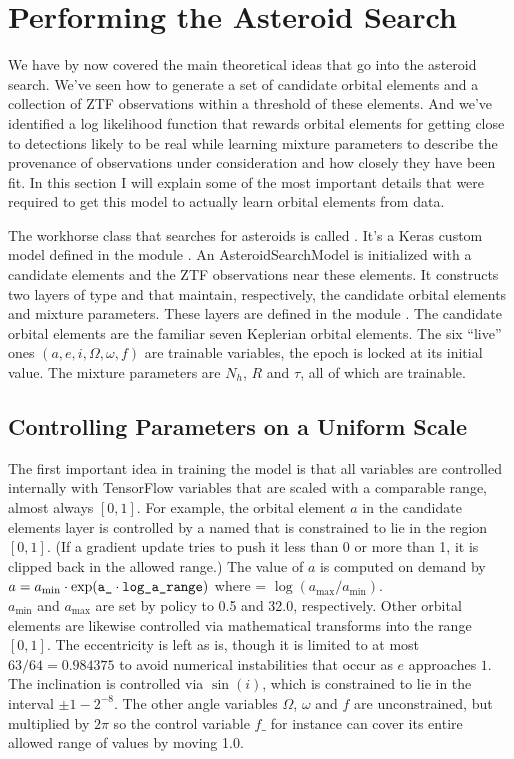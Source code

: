 \section{Performing the Asteroid Search}
\label{section_asteroid_search}
We have by now covered the main theoretical ideas that go into the asteroid search.
We've seen how to generate a set of candidate orbital elements and a collection of ZTF observations within a threshold of these elements.
And we've identified a log likelihood function that rewards orbital elements for getting close to detections likely to be real 
while learning mixture parameters to describe the provenance of observations under consideration and how closely they have been fit.
In this section I will explain some of the most important details that were required to get this model to actually learn orbital elements from data.

The workhorse class that searches for asteroids is called .  
It's a Keras custom model defined in the module .
An AsteroidSearchModel is initialized with a candidate elements and the ZTF observations near these elements.
It constructs two layers of type  and  that maintain, respectively, 
the candidate orbital elements and mixture parameters.
These layers are defined in the module .
The candidate orbital elements are the familiar seven Keplerian orbital elements.
The six ``live'' ones $(a, e, i, \Omega, \omega, f)$ are trainable variables, the epoch is locked at its initial value.
The mixture parameters are $N_h$, $R$ and $\tau$, all of which are trainable.

\subsection{Controlling Parameters on a Uniform Scale}
The first important idea in training the model is that all variables are controlled internally 
with TensorFlow variables that are scaled with a comparable range, almost always $[0, 1]$.
For example, the orbital element $a$ in the candidate elements layer is controlled by a 
named  that is constrained to lie in the region $[0, 1]$.
(If a gradient update tries to push it less than 0 or more than 1, it is clipped back in the allowed range.)
The value of $a$ is computed on demand by
$a = a_{\mathrm{min}} \cdot \exp( \texttt{a\_} \cdot \texttt{log\_a\_range})$ 
where  = $\log(a_{\mathrm{max}} / a_{\mathrm{min}})$.\\
$a_{\mathrm{min}}$ and $a_{\mathrm{max}}$ are set by policy to 0.5 and 32.0, respectively.
Other orbital elements are likewise controlled via mathematical transforms into the range $[0, 1]$.
The eccentricity is left as is, though it is limited to at most $63 / 64 = 0.984375$ to avoid numerical instabilities that occur as $e$ approaches $1$.
The inclination is controlled via $\sin(i)$, which is constrained to lie in the interval $\pm 1 - 2^{-8}$.
The other angle variables $\Omega$, $\omega$ and $f$ are unconstrained, but multiplied by $2 \pi$ 
so the control variable $f\_$ for instance can cover its entire allowed range of values by moving 1.0.

